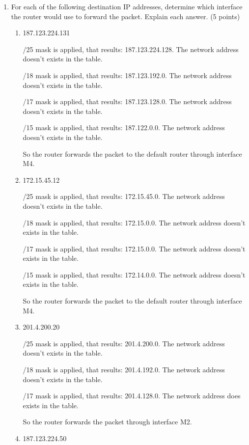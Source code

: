 \documentclass{article}
\begin{document}
\begin{enumerate}
  \item For each of the following destination IP addresses, determine which interface the router would use to forward the packet. Explain each answer. (5 points)
  \begin{enumerate}
    \item 187.123.224.131

    /25 mask is applied, that results: 187.123.224.128. The network address doesn't exists in the table.

    /18 mask is applied, that results: 187.123.192.0. The network address doesn't exists in the table.

    /17 mask is applied, that results: 187.123.128.0. The network address doesn't exists in the table.

    /15 mask is applied, that results: 187.122.0.0. The network address doesn't exists in the table.

    So the router forwards the packet to the default router through interface M4.
    
    \item 172.15.45.12

    /25 mask is applied, that results: 172.15.45.0. The network address doesn't exists in the table.

    /18 mask is applied, that results: 172.15.0.0. The network address doesn't exists in the table.

    /17 mask is applied, that results: 172.15.0.0. The network address doesn't exists in the table.

    /15 mask is applied, that results: 172.14.0.0. The network address doesn't exists in the table.

    So the router forwards the packet to the default router through interface M4.

    \item 201.4.200.20

    /25 mask is applied, that results: 201.4.200.0. The network address doesn't exists in the table.

    /18 mask is applied, that results: 201.4.192.0. The network address doesn't exists in the table.

    /17 mask is applied, that results: 201.4.128.0. The network address does exists in the table.

    So the router forwards the packet through interface M2.
    
    \item 187.123.224.50


\end{enumerate}
\end{enumerate}
\end{document}
